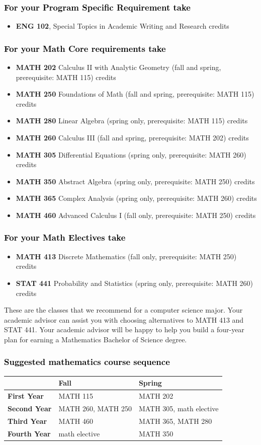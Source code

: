 \documentclass[10pt]{article}
\newcommand{\calconeshort}{MATH 115}
\newcommand{\calctwo}{\textbf{MATH 202} Calculus II with Analytic Geometry (fall and spring, prerequisite: MATH 115) \dotfill 5 credits }
\newcommand{\calctwoshort}{MATH 202}
\newcommand{\foundations}{\textbf{MATH 250} Foundations of Math (fall and spring, prerequisite: MATH 115)  \dotfill 3 credits}
\newcommand{\foundationsshort}{MATH 250}
\newcommand{\calcthree}{\textbf{MATH 260} Calculus III  (fall and spring, prerequisite: MATH 202) \dotfill 5 credits}
\newcommand{\calcthreeshort}{MATH 260}
\newcommand{\linear}{\textbf{MATH 280} Linear Algebra (spring only, prerequisite: MATH 115) \dotfill 3 credits}
\newcommand{\linearshort}{MATH 280}
\newcommand{\discrete}{\textbf{MATH 413} Discrete Mathematics  (fall only, prerequisite: MATH 250)\dotfill 3 credits}
\newcommand{\discreteshort}{MATH 413}
\newcommand{\statistics}{\textbf{STAT 441} Probability and Statistics (spring only, prerequisite: MATH 260)  \dotfill  3 credits}
\newcommand{\statisticsshort}{STAT 441}
\newcommand{\diffeq}{\textbf{MATH 305}	Differential Equations (spring only, prerequisite: MATH 260) \dotfill 	3 credits}
\newcommand{\diffeqshort}{MATH 305}
\newcommand{\abstractalgebra}{\textbf{MATH 350}	Abstract Algebra (spring only, prerequisite: MATH 250) \dotfill 	3 credits}
\newcommand{\abstractalgebrashort}{MATH 350}
\newcommand{\complex}{\textbf{MATH 365}	Complex Analysis (spring only,  prerequisite: MATH 260) \dotfill 3 credits}
\newcommand{\complexshort}{MATH 365}
\newcommand{\advancedcalc}{\textbf{MATH 460}	Advanced Calculus I  (fall only,   prerequisite: MATH 250) \dotfill 3 credits}
\newcommand{\advancedcalcshort}{MATH 460}
\newcommand{\mathBS}{
     \begin{center}
         \begin{tabular}[h]{| l | l | l|} 
            \hline
                       & \textbf{Fall}         &  \textbf{Spring}  \\ \hline 
            \textbf{First Year} & \calconeshort{}  & \calctwoshort \\  \hline
            \textbf{Second Year} &  \calcthreeshort{}, \foundationsshort & \diffeqshort, math elective \\ \hline
            \textbf{Third Year} & \advancedcalcshort              &  \complexshort{}, \linearshort \\ \hline
            \textbf{Fourth Year} & math elective &  \abstractalgebrashort  \\ \hline
         \end{tabular}
\end{center}}
\begin{document}
\subsubsection*{\textcolor{black}{For your Program Specific Requirement take}}

\begin{itemize}
   \item \textbf{ENG 102}, Special Topics in Academic Writing and Research  credits
\end{itemize}

	

\subsubsection*{\textcolor{black}{For your Math Core requirements take}}

\begin{itemize}
   \item \calctwo
   \item \foundations
   \item \linear
   \item \calcthree
   \item \diffeq
  \item \abstractalgebra
  \item \complex
  \item \advancedcalc
\end{itemize}



\subsubsection*{\textcolor{black}{For your  Math Electives take}}
\begin{itemize}
\item \discrete
\item \statistics
\end{itemize}
\vspace{0.1in}
These are the classes that we recommend for a computer science major.
Your academic advisor can assist you with choosing alternatives 
to \discreteshort{} and \statisticsshort{}. Your academic advisor 
will be happy to help you build a four-year plan for earning a 
Mathematics Bachelor of Science degree. 



\subsubsection*{\textcolor{black}{Suggested mathematics course sequence}}
   \mathBS
\end{document}
